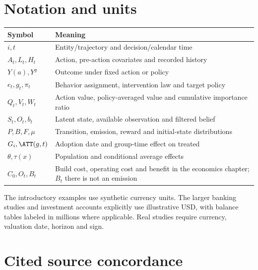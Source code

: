 \section{Notation and units}
\begin{longtable}{P{28mm}P{112mm}}
\toprule Symbol & Meaning\\\midrule\endhead
$i,t$ & Entity/trajectory and decision/calendar time\\
$A_t,L_t,H_t$ & Action, pre-action covariates and recorded history\\
$Y(a),Y^g$ & Outcome under fixed action or policy\\
$e_t,g_t,\pi_t$ & Behavior assignment, intervention law and target policy\\
$Q_t,V_t,W_t$ & Action value, policy-averaged value and cumulative importance ratio\\
$S_t,O_t,b_t$ & Latent state, available observation and filtered belief\\
$P,B,F,\mu$ & Transition, emission, reward and initial-state distributions\\
$G_i,\ATT(g,t)$ & Adoption date and group-time effect on treated\\
$\theta,\tau(x)$ & Population and conditional average effects\\
$C_0,O_t,B_t$ & Build cost, operating cost and benefit in the economics chapter; $B_t$ there is not an emission\\
\bottomrule
\end{longtable}
The introductory examples use synthetic currency units. The larger banking
studies and investment accounts explicitly use illustrative USD, with balance
tables labeled in millions where applicable. Real studies require currency, valuation
date, horizon and sign.

\section{Cited source concordance}
\small

\normalsize
